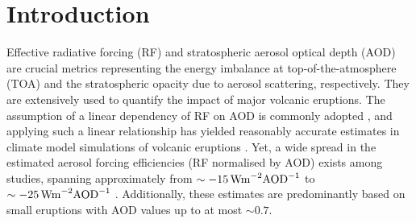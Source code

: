 \documentclass[draft]{agujournal2019}
\begin{document}
%
%


\section{Introduction}



Effective radiative forcing (RF) and stratospheric aerosol optical depth (AOD) are
crucial metrics representing the energy imbalance at top-of-the-atmosphere (TOA) and the
stratospheric opacity due to aerosol scattering, respectively. They are extensively used
to quantify the impact of major volcanic eruptions. The assumption of a linear
dependency of RF on AOD is commonly adopted \cite{myhre2013,andersson2015}, and applying
such a linear relationship has yielded reasonably accurate estimates in climate model
simulations of volcanic eruptions
\cite{mills2017,hansen2005,gregory2016,marshall2020,pitari2016b}. Yet, a wide spread in
the estimated aerosol forcing efficiencies (RF normalised by AOD) exists among studies,
spanning approximately from \(\sim \SI{-15}{\watt\metre^{-2}\ce{AOD}^{-1}}\)
\cite{pitari2016b} to \(\sim \SI{-25}{\watt\metre^{-2}\ce{AOD}^{-1}}\) \cite{myhre2013}.
Additionally, these estimates are predominantly based on small eruptions with AOD values
up to at most \(\sim 0.7\).
\end{document}
